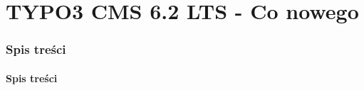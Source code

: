 \section*{TYPO3 CMS 6.2 LTS - Co nowego}
\begin{frame}[fragile]
	\frametitle{Spis treści}
	\framesubtitle{Spis treści}

	\begin{multicols}{2}
		\tableofcontents
	\end{multicols}

\end{frame}




















